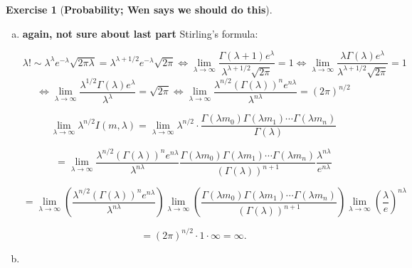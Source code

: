 \documentclass{article}
\theoremstyle{definition}
\newtheorem{exercise}{Exercise}
\newtheorem{definition}{Definition}
\theoremstyle{definition}
\theoremstyle{definition}
\theoremstyle{definition}
\begin{document}
\begin{exercise}[\textbf{Probability; Wen says we should do this}]
\begin{enumerate}[(a)]
\item \textbf{again, not sure about last part} Stirling's formula: 

\[
\lambda! \sim \lambda^\lambda e^{-\lambda} \sqrt{2\pi \lambda} = \lambda^{\lambda + 1/2} e^{-\lambda} \sqrt{2\pi } \iff \lim_{\lambda \to \infty} \frac{ \Gamma(\lambda+1) e^\lambda}{\lambda^{\lambda + 1/2}  \sqrt{2\pi }} = 1 \iff \lim_{\lambda \to \infty} \frac{\lambda \Gamma(\lambda) e^\lambda}{\lambda^{\lambda + 1/2}  \sqrt{2\pi }} = 1
\]
\[
 \iff \lim_{\lambda \to \infty} \frac{ \lambda^{1/2} \Gamma(\lambda) e^\lambda}{\lambda^{\lambda}  } = \sqrt{2\pi }  \iff \lim_{\lambda \to \infty} \frac{ \lambda^{n/2} \left( \Gamma(\lambda) \right)^n e^{n\lambda}}{\lambda^{n\lambda}  } = (2\pi )^{n/2}
\]

%
%


\[
\lim_{\lambda \to \infty} \lambda^{n/2} I(m, \lambda) = \lim_{\lambda \to \infty} \lambda^{n/2} \cdot \frac{\Gamma(\lambda m_0) \Gamma(\lambda m_1) \cdots \Gamma(\lambda m_n)}{\Gamma(\lambda)} 
\]

\[
= \lim_{\lambda \to \infty} \frac{ \lambda^{n/2} \left( \Gamma(\lambda) \right)^n e^{n \lambda}}{\lambda^{n\lambda}  }  \frac{\Gamma(\lambda m_0) \Gamma(\lambda m_1) \cdots \Gamma(\lambda m_n)}{(\Gamma(\lambda))^{n+1}} \frac{\lambda^{n \lambda}}{e^{n \lambda}}
\]

\[
= \lim_{\lambda \to \infty}  \left( \frac{ \lambda^{n/2} \left( \Gamma(\lambda) \right)^n e^{n \lambda}}{\lambda^{n\lambda}  }  \right) \lim_{\lambda \to \infty}  \left( \frac{\Gamma(\lambda m_0) \Gamma(\lambda m_1) \cdots \Gamma(\lambda m_n)}{(\Gamma(\lambda))^{n+1}} \right) \lim_{\lambda \to \infty}  \left( \frac{\lambda}{e} \right) ^{n \lambda}
\]

\[
= (2\pi )^{n/2} \cdot 1 \cdot \infty = \infty.
\]

\item

\

\begin{center}
\noindent{}
\end{center}
\end{enumerate}
\end{exercise}
\end{document}
